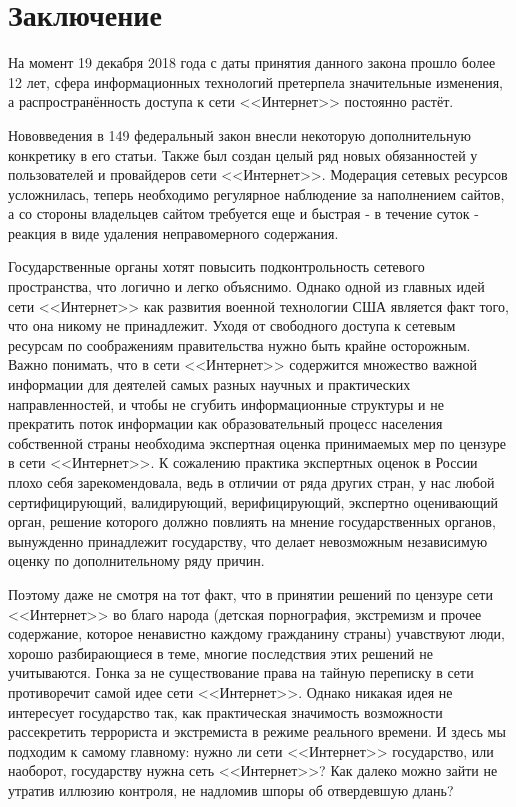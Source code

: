 \section{Заключение}


На момент 19 декабря 2018 года с даты принятия данного закона прошло более 12 лет, сфера информационных технологий претерпела значительные изменения, а распространённость доступа к сети <<Интернет>> постоянно растёт.


Нововведения в 149 федеральный закон внесли некоторую дополнительную конкретику в его статьи. Также был создан целый ряд новых обязанностей у пользователей и провайдеров сети <<Интернет>>. Модерация сетевых ресурсов усложнилась, теперь необходимо регулярное наблюдение за наполнением сайтов, а со стороны владельцев сайтом требуется еще и быстрая - в течение суток - реакция в виде удаления неправомерного содержания.


Государственные органы хотят повысить подконтрольность сетевого пространства, что логично и легко объяснимо. Однако одной из главных идей сети <<Интернет>> как развития военной технологии США является факт того, что она никому не принадлежит. Уходя от свободного доступа к сетевым ресурсам по соображениям правительства нужно быть крайне осторожным. Важно понимать, что в сети <<Интернет>> содержится множество важной информации для деятелей самых разных научных и практических направленностей, и чтобы не сгубить информационные структуры и не прекратить поток информации как образовательный процесс населения собственной страны необходима экспертная оценка принимаемых мер по цензуре в сети <<Интернет>>. К сожалению практика экспертных оценок в России плохо себя зарекомендовала, ведь в отличии от ряда других стран, у нас любой сертифицирующий, валидирующий, верифицирующий, экспертно оценивающий орган, решение которого должно повлиять на мнение государственных органов, вынужденно принадлежит государству, что делает невозможным независимую оценку по дополнительному ряду причин. 


Поэтому даже не смотря на тот факт, что в принятии решений по цензуре сети <<Интернет>> во благо народа (детская порнография, экстремизм и прочее содержание, которое ненавистно каждому гражданину страны) учавствуют люди, хорошо разбирающиеся в теме, многие последствия этих решений не учитываются. Гонка за не существование права на тайную переписку в сети противоречит самой идее сети <<Интернет>>. Однако никакая идея не интересует государство так, как практическая значимость возможности рассекретить террориста и экстремиста в режиме реального времени. И здесь мы подходим к самому главному: нужно ли сети <<Интернет>> государство, или наоборот, государству нужна сеть <<Интернет>>? Как далеко можно зайти не утратив иллюзию контроля, не надломив шпоры об отвердевшую длань?


